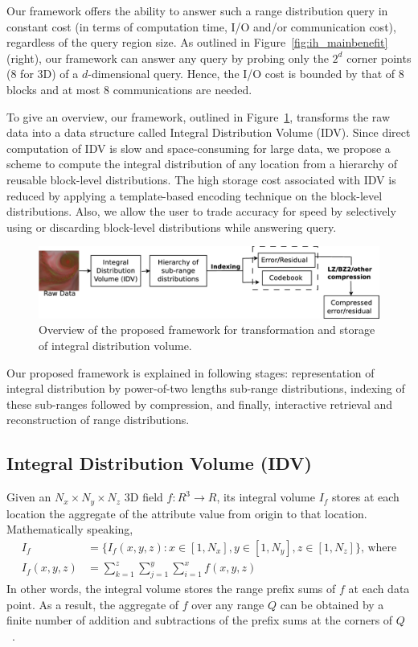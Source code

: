 Our framework offers the ability to answer such a range distribution query in constant cost (in terms of computation time, I/O and/or communication cost), regardless of the query region size. As outlined in Figure~\ref{fig:ih_mainbenefit} (right), our framework can answer any query by probing only the $2^d$ corner points (8 for 3D) of a $d$-dimensional query. Hence, the I/O cost is bounded by that of 8 blocks and at most 8 communications are needed.

To give an overview, our framework, outlined in Figure~\ref{fig:ih_overview}, transforms the raw data into a data structure called Integral Distribution Volume (IDV). Since direct computation of IDV is slow and space-consuming for large data, we propose a scheme to compute the integral distribution of any location from a hierarchy of reusable block-level distributions. The high storage cost associated with IDV is reduced by applying a template-based encoding technique on the block-level distributions. Also, we allow the user to trade accuracy for speed by selectively using or discarding block-level distributions while answering query.
\begin{figure}[tb]
\centering
	\includegraphics[width = \linewidth, keepaspectratio = true]{images/eps/overview.eps}
	\caption{Overview of the proposed framework for transformation and storage of integral distribution volume.}	
	\label{fig:ih_overview}	
\end{figure}

Our proposed framework is explained in following stages: representation of integral distribution by power-of-two lengths sub-range distributions, indexing of these sub-ranges followed by compression, and finally, interactive retrieval and reconstruction of range distributions. 
\subsection{Integral Distribution Volume (IDV)}
\label{subsec:ih_def}
Given an $N_x\times N_y\times N_z$ 3D field $f:R^3\to R$, its integral volume $I_f$ stores at each location the aggregate of the attribute value from origin to that location. Mathematically speaking, 
\begin{align*}
I_f &= \{ I_f(x,y,z) : x\in [1,N_x], y\in [1,N_y], z\in [1,N_z]\}\text{, where}\\
I_f(x,y,z) &= \sum_{k=1}^{z}\sum_{j=1}^{y}\sum_{i=1}^{x} f(x, y, z) 
\end{align*}
In other words, the integral volume stores the range prefix sums of $f$ at each data point. As a result, the aggregate of $f$ over any range $Q$ can be obtained by a finite number of addition and subtractions of the prefix sums at the corners of $Q$~\cite{SAT84, integhist05}. 

